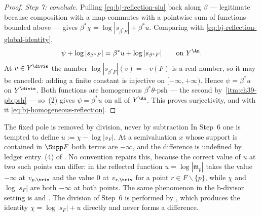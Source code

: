 \begin{proof}
\medskip
\noindent\emph{Step 7: conclude.}
Pulling \eqref{eq:bj-reflection-siu} back along $\beta$ --- legitimate
because composition with a map commutes with a pointwise sum of functions
bounded above --- gives
$\beta^*\chi=\log|s_{\beta^*F}|+\beta^*u$.  Comparing with
\eqref{eq:bj-reflection-global-identity},
\[
 \psi+\log|s_{\beta^*F}|=\beta^*u+\log|s_{\beta^*F}|
 \qquad\text{on }Y^{\An}.
\]
At $v\in Y^{\divis}$ the number $\log|s_{\beta^*F}|(v)=-v(F)$ is a real
number, so it may be cancelled: adding a finite constant is injective on
$[-\infty,+\infty)$.  Hence $\psi=\beta^*u$ on $Y^{\divis}$.  Both
functions are homogeneous $\beta^*\theta$-psh --- the second by
\,\cref{itm:ch39-pb:psh} --- so
\,(2) gives $\psi=\beta^*u$ on all
of $Y^{\An}$.  This proves surjectivity, and with it
\eqref{eq:bj-homogeneous-reflection}.
\end{proof}

\begin{warning}{The fixed pole is removed by division, never by subtraction}
\label{warn:ch39-no-subtraction}
In Step~6 one is tempted to define $u:=\chi-\log|s_F|$.  At a
semivaluation $x$ whose support is contained in $\Supp F$ both terms are
$-\infty$, and the difference is undefined by ledger entry~(4) of
.  No convention repairs this, because the
correct value of $u$ at two such points can differ: in
 the reflected function
$u=\log|\mathfrak m_p|$ takes the value $-\infty$ at $v_{p,\triv}$ and
the value $0$ at $v_{r,\triv}$ for a point $r\in F\smallsetminus\{p\}$,
while $\chi$ and $\log|s_F|$ are both $-\infty$ at both points.  The
same phenomenon in the b-divisor setting is
 and .  The
division of Step~6 is performed by
, which produces the identity
$\chi=\log|s_F|+u$ directly and never forms a difference.
\end{warning}

